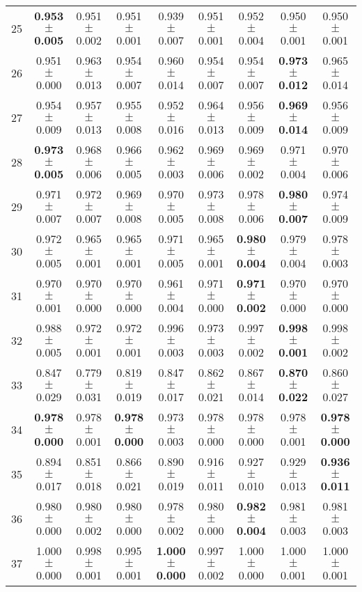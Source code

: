 \begin{table}[!ht]
{\begin{tabular}{r c c c c c c c c}
25 & \textbf{0.953 $\pm$ 0.005} & 0.951 $\pm$ 0.002 & 0.951 $\pm$ 0.001 & 0.939 $\pm$ 0.007 & 0.951 $\pm$ 0.001 & 0.952 $\pm$ 0.004 & 0.950 $\pm$ 0.001 & 0.950 $\pm$ 0.001 \\
26 & 0.951 $\pm$ 0.000 & 0.963 $\pm$ 0.013 & 0.954 $\pm$ 0.007 & 0.960 $\pm$ 0.014 & 0.954 $\pm$ 0.007 & 0.954 $\pm$ 0.007 & \textbf{0.973 $\pm$ 0.012} & 0.965 $\pm$ 0.014 \\
27 & 0.954 $\pm$ 0.009 & 0.957 $\pm$ 0.013 & 0.955 $\pm$ 0.008 & 0.952 $\pm$ 0.016 & 0.964 $\pm$ 0.013 & 0.956 $\pm$ 0.009 & \textbf{0.969 $\pm$ 0.014} & 0.956 $\pm$ 0.009 \\
28 & \textbf{0.973 $\pm$ 0.005} & 0.968 $\pm$ 0.006 & 0.966 $\pm$ 0.005 & 0.962 $\pm$ 0.003 & 0.969 $\pm$ 0.006 & 0.969 $\pm$ 0.002 & 0.971 $\pm$ 0.004 & 0.970 $\pm$ 0.006 \\
29 & 0.971 $\pm$ 0.007 & 0.972 $\pm$ 0.007 & 0.969 $\pm$ 0.008 & 0.970 $\pm$ 0.005 & 0.973 $\pm$ 0.008 & 0.978 $\pm$ 0.006 & \textbf{0.980 $\pm$ 0.007} & 0.974 $\pm$ 0.009 \\
30 & 0.972 $\pm$ 0.005 & 0.965 $\pm$ 0.001 & 0.965 $\pm$ 0.001 & 0.971 $\pm$ 0.005 & 0.965 $\pm$ 0.001 & \textbf{0.980 $\pm$ 0.004} & 0.979 $\pm$ 0.004 & 0.978 $\pm$ 0.003 \\
31 & 0.970 $\pm$ 0.001 & 0.970 $\pm$ 0.000 & 0.970 $\pm$ 0.000 & 0.961 $\pm$ 0.004 & 0.971 $\pm$ 0.000 & \textbf{0.971 $\pm$ 0.002} & 0.970 $\pm$ 0.000 & 0.970 $\pm$ 0.000 \\
32 & 0.988 $\pm$ 0.005 & 0.972 $\pm$ 0.001 & 0.972 $\pm$ 0.001 & 0.996 $\pm$ 0.003 & 0.973 $\pm$ 0.003 & 0.997 $\pm$ 0.002 & \textbf{0.998 $\pm$ 0.001} & 0.998 $\pm$ 0.002 \\
33 & 0.847 $\pm$ 0.029 & 0.779 $\pm$ 0.031 & 0.819 $\pm$ 0.019 & 0.847 $\pm$ 0.017 & 0.862 $\pm$ 0.021 & 0.867 $\pm$ 0.014 & \textbf{0.870 $\pm$ 0.022} & 0.860 $\pm$ 0.027 \\
34 & \textbf{0.978 $\pm$ 0.000} & 0.978 $\pm$ 0.001 & \textbf{0.978 $\pm$ 0.000} & 0.973 $\pm$ 0.003 & 0.978 $\pm$ 0.000 & 0.978 $\pm$ 0.000 & 0.978 $\pm$ 0.001 & \textbf{0.978 $\pm$ 0.000} \\
35 & 0.894 $\pm$ 0.017 & 0.851 $\pm$ 0.018 & 0.866 $\pm$ 0.021 & 0.890 $\pm$ 0.019 & 0.916 $\pm$ 0.011 & 0.927 $\pm$ 0.010 & 0.929 $\pm$ 0.013 & \textbf{0.936 $\pm$ 0.011} \\
36 & 0.980 $\pm$ 0.000 & 0.980 $\pm$ 0.002 & 0.980 $\pm$ 0.000 & 0.978 $\pm$ 0.002 & 0.980 $\pm$ 0.000 & \textbf{0.982 $\pm$ 0.004} & 0.981 $\pm$ 0.003 & 0.981 $\pm$ 0.003 \\
37 & 1.000 $\pm$ 0.000 & 0.998 $\pm$ 0.001 & 0.995 $\pm$ 0.001 & \textbf{1.000 $\pm$ 0.000} & 0.997 $\pm$ 0.002 & 1.000 $\pm$ 0.000 & 1.000 $\pm$ 0.001 & 1.000 $\pm$ 0.001 \\

\end{tabular}}
\end{table}
